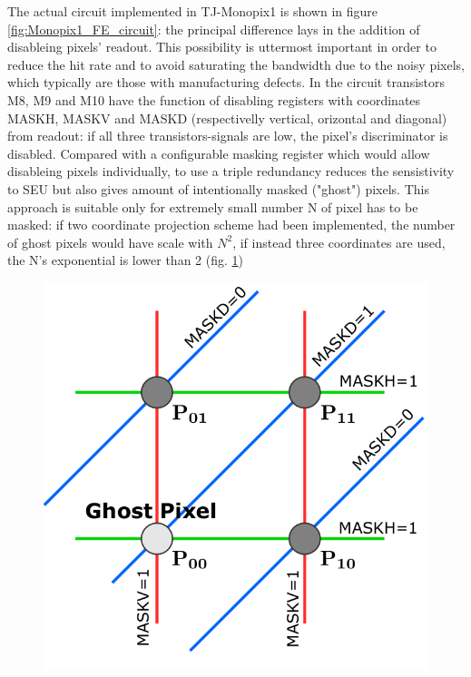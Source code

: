     
            The actual circuit implemented in TJ-Monopix1 is shown in figure \ref{fig:Monopix1_FE_circuit}: the principal difference lays in the addition of disableing pixels' readout. This possibility is uttermost important in order to reduce the hit rate and to avoid saturating the bandwidth due to the noisy pixels, which typically are those with manufacturing defects.
            In the circuit transistors M8, M9 and M10 have the function of disabling registers with coordinates MASKH, MASKV and MASKD (respectivelly vertical, orizontal and diagonal) from readout: if all three transistors-signals are low, the pixel's discriminator is disabled. 
            Compared with a configurable masking register which would allow disableing pixels individually, to use a triple redundancy reduces the sensistivity to SEU but also gives amount of intentionally masked ("ghost") pixels.
            This approach is suitable only for extremely small number N of pixel has to be masked: if two coordinate projection scheme had been implemented, the number of ghost pixels would have scale with $N^2$, if instead three coordinates are used, the N's exponential is lower than 2 (fig. \ref{fig:masking_scheme})
            \begin{figure}[h!]
                \centering
                \includegraphics[width=.3\linewidth]{figures/Monopix1/masking_scheme.png}
                \caption{}
                \label{fig:masking_scheme}
            \end{figure}

